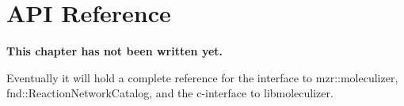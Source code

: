\chapter {API Reference}

\bf{This chapter has not been written yet.}

Eventually it will hold a complete reference for the interface to
mzr::moleculizer, fnd::ReactionNetworkCatalog, and the c-interface to
libmoleculizer.



